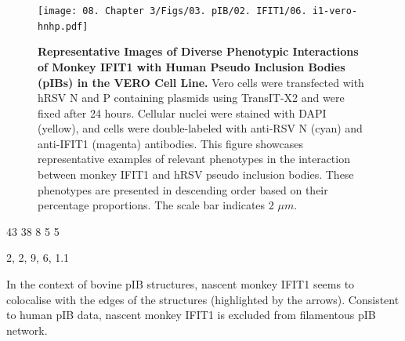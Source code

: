\begin{figure}
    \centering
    \texttt{[image: 08. Chapter 3/Figs/03. pIB/02. IFIT1/06. i1-vero-hnhp.pdf]}
    \caption[Representative Images of Diverse Phenotypic Interactions of Monkey IFIT1 with Human Pseudo Inclusion Bodies (pIBs) in the VERO Cell Line.]{\textbf{Representative Images of Diverse Phenotypic Interactions of Monkey IFIT1 with Human Pseudo Inclusion Bodies (pIBs) in the VERO Cell Line.} Vero cells were transfected with hRSV N and P containing plasmids using TransIT-X2 and were fixed after 24 hours. Cellular nuclei were stained with DAPI (yellow), and cells were double-labeled with anti-RSV N (cyan) and anti-IFIT1 (magenta) antibodies. This figure showcases representative examples of relevant phenotypes in the interaction between monkey IFIT1 and hRSV pseudo inclusion bodies. These phenotypes are presented in descending order based on their percentage proportions. The scale bar indicates 2 \(\mu m\).}
    \label{fig:Representative Images of Diverse Phenotypic Interactions of Monkey IFIT1 with Human Pseudo Inclusion Bodies (pIBs) in the VERO Cell Line}
\end{figure}

43 38 8 5 5

2, 2, 9, 6, 1.1

In the context of bovine pIB structures, nascent monkey IFIT1 seems to colocalise with the edges of the structures (highlighted by the arrows). Consistent to human pIB data, nascent monkey IFIT1 is excluded from filamentous pIB network.

